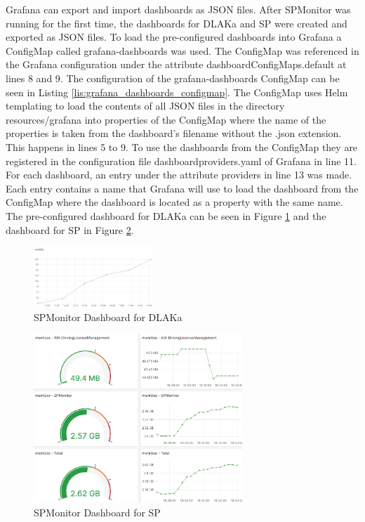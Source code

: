 Grafana can export and import dashboards as JSON files. After SPMonitor was running
for the first time, the dashboards for DLAKa and SP were created and exported as JSON files.
To load the pre-configured dashboards into Grafana a ConfigMap called grafana-dashboards was used.
The ConfigMap was referenced in the Grafana configuration under the attribute dashboardConfigMaps.default at lines 8 and 9.
The configuration of the grafana-dashboards ConfigMap can be seen in Listing \ref{lis:grafana_dashboards_configmap}.
The ConfigMap uses Helm templating to load the contents of all JSON files in the directory
resources/grafana into properties of the ConfigMap where the name of the properties is taken
from the dashboard's filename without the .json extension.
This happens in lines 5 to 9.
To use the dashboards from the ConfigMap they are registered in the configuration file dashboardproviders.yaml
of Grafana in line 11. For each dashboard, an entry under the attribute providers in line 13 was made.
Each entry contains a name that Grafana will use to load the dashboard from the ConfigMap
where the dashboard is located as a property with the same name.
The pre-configured dashboard for DLAKa can be seen in Figure \ref{fig:spmonitor_dlaka_dashboard}
and the dashboard for SP in Figure \ref{fig:spmonitor_sp_dashboard}.

\begin{figure}[tb]
  \centering
  \includegraphics[width=0.4\textwidth]{figures/spmonitor_dlaka_dashboard.png}
  \caption{SPMonitor Dashboard for DLAKa}
  \label{fig:spmonitor_dlaka_dashboard}
\end{figure}

\begin{figure}[tb]
  \centering
  \includegraphics[width=0.7\textwidth]{figures/spmonitor_sp_dashboard.png}
  \caption{SPMonitor Dashboard for SP}
  \label{fig:spmonitor_sp_dashboard}
\end{figure}

